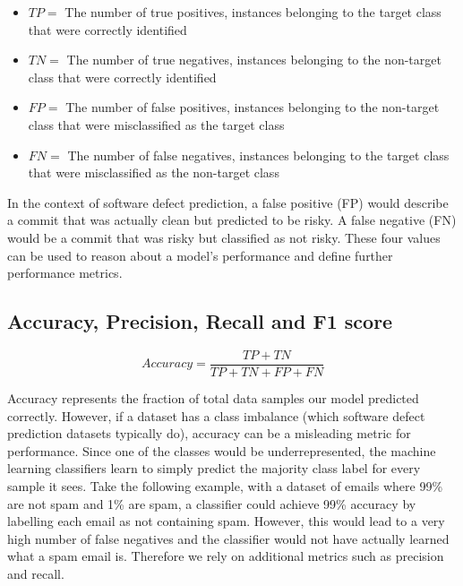 \documentclass[../main.tex]{subfiles}
\begin{document}
\begin{itemize}
    \item $TP=$ The number of true positives, instances belonging to the target class that were correctly identified
    
    \item $TN=$ The number of true negatives, instances belonging to the non-target class that were correctly identified
    
    \item $FP=$ The number of false positives, instances belonging to the non-target class that were misclassified as the target class
    
    \item $FN=$ The number of false negatives, instances belonging to the target class that were misclassified as the non-target class
\end{itemize}

In the context of software defect prediction, a false positive (FP) would describe a commit that was actually clean but predicted to be risky. A false negative (FN) would be a commit that was risky but classified as not risky. These four values can be used to reason about a model's performance and define further performance metrics. 

\subsection{Accuracy, Precision, Recall and F1 score}

\vspace{20pt}

\begin{equation}
    Accuracy = \frac{TP+TN}{TP+TN+FP+FN}
\end{equation}

\vspace{10pt}

Accuracy represents the fraction of total data samples our model predicted correctly. However, if a dataset has a class imbalance (which software defect prediction datasets typically do), accuracy can be a misleading metric for performance. Since one of the classes would be underrepresented, the machine learning classifiers learn to simply predict the majority class label for every sample it sees. Take the following example, with a dataset of emails where 99\% are not spam and 1\% are spam, a classifier could achieve 99\% accuracy by labelling each email as not containing spam. However, this would lead to a very high number of false negatives and the classifier would not have actually learned what a spam email is. Therefore we rely on additional metrics such as precision and recall.
\end{document}
